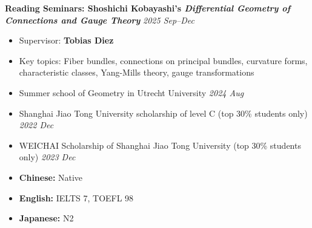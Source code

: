 \documentclass[12pt]{article}
\begin{document}
\noindent\textbf{Reading Seminars: Shoshichi Kobayashi's \emph{Differential Geometry of Connections and Gauge Theory} } \hfill \textit{2025 Sep--Dec}
\vspace{0.1cm}
\begin{itemize}[noitemsep, topsep=0pt, partopsep=0pt, parsep=0pt, leftmargin=0.3cm]
  \item Supervisor: \textbf{Tobias Diez}
  \item Key topics: Fiber bundles, connections on principal bundles, curvature forms, characteristic classes, Yang-Mills theory, gauge transformations
\end{itemize}

\vspace{0.3cm}

\vspace{0.2cm}

\begin{itemize}[noitemsep, topsep=0pt, partopsep=0pt, parsep=0pt, leftmargin=0.3cm]
    \item Summer school of Geometry in Utrecht University \hfill \textit{2024 Aug}
\end{itemize}

\vspace{0.2cm}

\vspace{0.2cm}

\begin{itemize}[noitemsep, topsep=0pt, partopsep=0pt, parsep=0pt, leftmargin=0.3cm]
    \item Shanghai Jiao Tong University scholarship of level C (top 30\% students only) \hfill \textit{2022 Dec}
    \item WEICHAI Scholarship of Shanghai Jiao Tong University (top 30\% students only) \hfill \textit{2023 Dec}
\end{itemize}

\vspace{0.2cm}

\vspace{0.2cm}

\begin{itemize}[noitemsep, topsep=0pt, partopsep=0pt, parsep=0pt, leftmargin=0.3cm]
  \item \textbf{Chinese:} Native
  \item \textbf{English:} IELTS 7, TOEFL 98
  \item \textbf{Japanese:} N2
\end{itemize}
\end{document}
